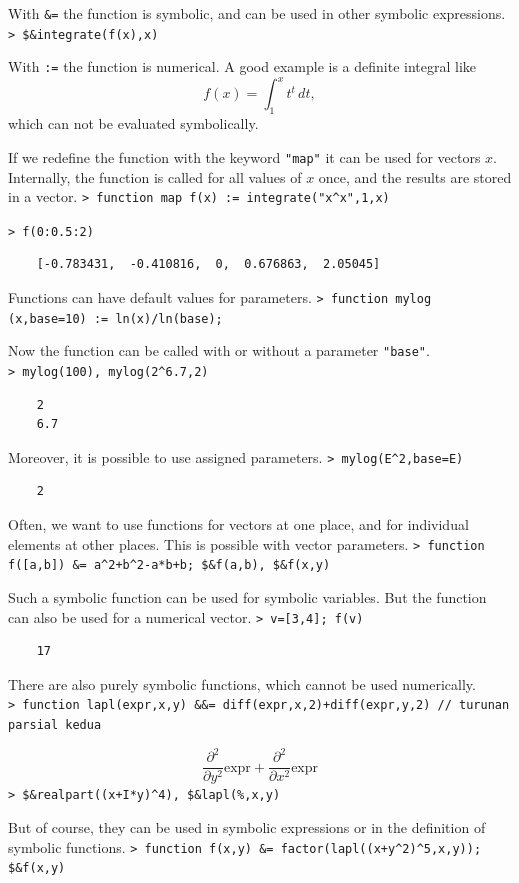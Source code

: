 \documentclass[11pt, a4paper]{article}
\newcommand{\emtcmd}[1]{\noindent\texttt{\textcolor{emtcommand}{>}\ #1}\par\smallskip}
\begin{document}
With \texttt{\&=} the function is symbolic, and can be used in other symbolic expressions.
\emtcmd{\$\&integrate(f(x),x)}

With \texttt{:=} the function is numerical. A good example is a definite integral like
$$f(x) = \int_1^x t^t \, dt,$$
which can not be evaluated symbolically.

If we redefine the function with the keyword \texttt{"map"} it can be used for vectors $x$. Internally, the function is called for all values of $x$ once, and the results are stored in a vector.
\emtcmd{function map f(x) := integrate("x\^{}x",1,x)}
\emtcmd{f(0:0.5:2)}
\begin{verbatim}
    [-0.783431,  -0.410816,  0,  0.676863,  2.05045]
\end{verbatim}

Functions can have default values for parameters.
\emtcmd{function mylog (x,base=10) := ln(x)/ln(base);}

Now the function can be called with or without a parameter \texttt{"base"}.
\emtcmd{mylog(100), mylog(2\^{}6.7,2)}
\begin{verbatim}
    2
    6.7
\end{verbatim}

Moreover, it is possible to use assigned parameters.
\emtcmd{mylog(E\^{}2,base=E)}
\begin{verbatim}
    2
\end{verbatim}

Often, we want to use functions for vectors at one place, and for individual elements at other places. This is possible with vector parameters.
\emtcmd{function f([a,b]) \&= a\^{}2+b\^{}2-a*b+b; \$\&f(a,b), \$\&f(x,y)}

Such a symbolic function can be used for symbolic variables. But the function can also be used for a numerical vector.
\emtcmd{v=[3,4]; f(v)}
\begin{verbatim}
    17
\end{verbatim}

There are also purely symbolic functions, which cannot be used numerically.
\emtcmd{function lapl(expr,x,y) \&\&= diff(expr,x,2)+diff(expr,y,2) \textcolor{emtcomment}{// turunan parsial kedua}}
$$\frac{\partial^2}{\partial y^2}\mathrm{expr} + \frac{\partial^2}{\partial x^2}\mathrm{expr}$$
\emtcmd{\$\&realpart((x+I*y)\^{}4), \$\&lapl(\%,x,y)}

But of course, they can be used in symbolic expressions or in the definition of symbolic functions.
\emtcmd{function f(x,y) \&= factor(lapl((x+y\^{}2)\^{}5,x,y)); \$\&f(x,y)}
\end{document}
